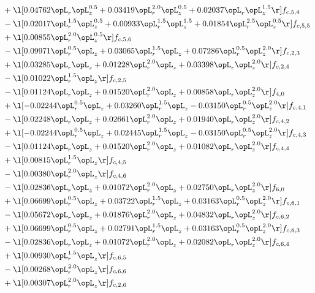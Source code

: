 \begin{alignat}{2}
& + \l[  0.04762 \opL_r \opL_z^{0.5} +  0.03419 \opL_r^{2.0} \opL_z^{0.5} +  0.02037 \opL_r \opL_z^{1.5}  \r] f_{c,5,4} \nonumber \\ 
& - \l[  0.02017 \opL_r^{1.5} \opL_z^{0.5} +  0.00933 \opL_r^{1.5} \opL_z^{1.5} +  0.01854 \opL_r^{2.5} \opL_z^{0.5}  \r] f_{c,5,5} \nonumber \\ 
& + \l[  0.00855 \opL_r^{2.0} \opL_z^{0.5}  \r] f_{c,5,6} \nonumber \\ 
& - \l[  0.09971 \opL_r^{0.5} \opL_z +  0.03065 \opL_r^{1.5} \opL_z +  0.07286 \opL_r^{0.5} \opL_z^{2.0}  \r] f_{c,2,3} \nonumber \\ 
& + \l[  0.03285 \opL_r \opL_z +  0.01228 \opL_r^{2.0} \opL_z +  0.03398 \opL_r \opL_z^{2.0}  \r] f_{c,2,4} \nonumber \\ 
& - \l[  0.01022 \opL_r^{1.5} \opL_z  \r] f_{c,2,5} \nonumber \\ 
& - \l[  0.01124 \opL_r \opL_z +  0.01520 \opL_r^{2.0} \opL_z +  0.00858 \opL_r \opL_z^{2.0}  \r] f_{4,0} \nonumber \\ 
& + \l[  -0.02244 \opL_r^{0.5} \opL_z +  0.03260 \opL_r^{1.5} \opL_z   -0.03150 \opL_r^{0.5} \opL_z^{2.0}  \r] f_{c,4,1} \nonumber \\ 
& - \l[  0.02248 \opL_r \opL_z +  0.02661 \opL_r^{2.0} \opL_z +  0.01940 \opL_r \opL_z^{2.0}  \r] f_{c,4,2} \nonumber \\ 
& + \l[  -0.02244 \opL_r^{0.5} \opL_z +  0.02445 \opL_r^{1.5} \opL_z   -0.03150 \opL_r^{0.5} \opL_z^{2.0}  \r] f_{c,4,3} \nonumber \\ 
& - \l[  0.01124 \opL_r \opL_z +  0.01520 \opL_r^{2.0} \opL_z +  0.01082 \opL_r \opL_z^{2.0}  \r] f_{c,4,4} \nonumber \\ 
& + \l[  0.00815 \opL_r^{1.5} \opL_z  \r] f_{c,4,5} \nonumber \\ 
& - \l[  0.00380 \opL_r^{2.0} \opL_z  \r] f_{c,4,6} \nonumber \\ 
& - \l[  0.02836 \opL_r \opL_z +  0.01072 \opL_r^{2.0} \opL_z +  0.02750 \opL_r \opL_z^{2.0}  \r] f_{6,0} \nonumber \\ 
& + \l[  0.06699 \opL_r^{0.5} \opL_z +  0.03722 \opL_r^{1.5} \opL_z +  0.03163 \opL_r^{0.5} \opL_z^{2.0}  \r] f_{c,6,1} \nonumber \\ 
& - \l[  0.05672 \opL_r \opL_z +  0.01876 \opL_r^{2.0} \opL_z +  0.04832 \opL_r \opL_z^{2.0}  \r] f_{c,6,2} \nonumber \\ 
& + \l[  0.06699 \opL_r^{0.5} \opL_z +  0.02791 \opL_r^{1.5} \opL_z +  0.03163 \opL_r^{0.5} \opL_z^{2.0}  \r] f_{c,6,3} \nonumber \\ 
& - \l[  0.02836 \opL_r \opL_z +  0.01072 \opL_r^{2.0} \opL_z +  0.02082 \opL_r \opL_z^{2.0}  \r] f_{c,6,4} \nonumber \\ 
& + \l[  0.00930 \opL_r^{1.5} \opL_z  \r] f_{c,6,5} \nonumber \\ 
& - \l[  0.00268 \opL_r^{2.0} \opL_z  \r] f_{c,6,6} \nonumber \\ 
& + \l[  0.00307 \opL_r^{2.0} \opL_z  \r] f_{c,2,6} \nonumber \\ 
\end{alignat} 


